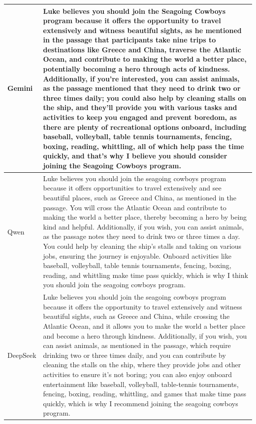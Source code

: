 \begin{table}[htbp]
\begin{tabular}{lp{12cm}}
Gemini \cite{geminiteam2024geminifamilyhighlycapable}                         & Luke believes you should join   the Seagoing Cowboys program because it offers the opportunity to travel   extensively and witness beautiful sights, as he mentioned in the passage that   participants take nine trips to destinations like Greece and China, traverse   the Atlantic Ocean, and contribute to making the world a better place,   potentially becoming a hero through acts of kindness. Additionally, if you're interested, you can assist animals, as the passage   mentioned that they need to drink two or three times daily; you could also   help by cleaning stalls on the ship, and they'll provide you with various   tasks and activities to keep you engaged and prevent boredom, as there are   plenty of recreational options onboard, including baseball, volleyball, table   tennis tournaments, fencing, boxing, reading, whittling, all of which help   pass the time quickly, and that's why I believe you should consider joining   the Seagoing Cowboys program. \\ \midrule
Qwen \cite{qwen2025qwen25technicalreport}                           & Luke believes you should join   the seagoing cowboys program because it offers opportunities to travel   extensively and see beautiful places, such as Greece and China, as mentioned   in the passage. You will cross the Atlantic Ocean and contribute to making the   world a better place, thereby becoming a hero by being kind and   helpful. Additionally, if you wish, you can assist animals, as the passage notes   they need to drink two or three times a day. You could help by cleaning the   ship's stalls and taking on various jobs, ensuring the journey is enjoyable.   Onboard activities like baseball, volleyball, table tennis tournaments,   fencing, boxing, reading, and whittling make time pass quickly, which is why   I think you should join the seagoing cowboys program. \\ \midrule
DeepSeek \cite{deepseekai2024deepseekv3technicalreport}                       & Luke believes you should join   the seagoing cowboys program because it offers the opportunity to travel   extensively and witness beautiful sights, such as Greece and China, while   crossing the Atlantic Ocean, and it allows you to make the world a better place   and become a hero through kindness. Additionally, if you wish, you can assist animals, as mentioned in the   passage, which require drinking two or three times daily, and you can   contribute by cleaning the stalls on the ship, where they provide jobs and   other activities to ensure it's not boring; you can also enjoy onboard   entertainment like baseball, volleyball, table-tennis tournaments, fencing,   boxing, reading, whittling, and games that make time pass quickly, which is   why I recommend joining the seagoing cowboys program. \\ \bottomrule
\end{tabular}
\end{table}

